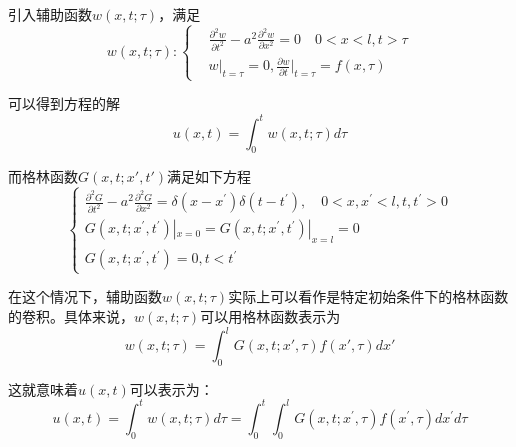 引入辅助函数$w(x,t;\tau)$，满足
$$w(x,t;\tau):\left\{
\begin{aligned}
&
\frac{\partial^2{w}}{\partial{t}^2}-a^2\frac{\partial^2{w}}{\partial{x}^2}=0\quad 0<x<l,t>\tau\\
&w|_{t=\tau}=0,\frac{\partial{w}}{\partial t}\bigg|_{t=\tau}=f(x,\tau)
        \end{aligned}
\right.$$

可以得到方程的解
$$u(x,t)=\int_0^tw(x,t;\tau)d\tau$$

而格林函数$G(x,t;x',t')$满足如下方程
$$\begin{cases}
    \frac{\partial^2G}{\partial t^2}-a^2\frac{\partial^2G}{\partial x^2}=\delta(x-x^{\prime})\delta(t-t^{\prime}),\quad 0<x,x^{\prime}<l,t,t^{\prime}>0\\
    G(x,t;x^{\prime},t^{\prime})|_{x=0}=G(x,t;x^{\prime},t^{\prime})|_{x=l}=0\\
    G(x,t;x^{\prime},t^{\prime})=0,t<t^{\prime}\end{cases}$$

    在这个情况下，辅助函数$w(x,t;\tau)$实际上可以看作是特定初始条件下的格林函数的卷积。具体来说，$w(x,t;\tau)$可以用格林函数表示为
    $$w(x,t;\tau)=\int_0^lG(x,t;x',\tau)f(x',\tau)dx'$$

    这就意味着$u(x,t)$可以表示为：$$u(x,t)=\int_0^tw(x,t;\tau)d\tau=\int_0^t\int_0^lG(x,t;x^{\prime},\tau)f(x^{\prime},\tau)dx^{\prime}d\tau $$

